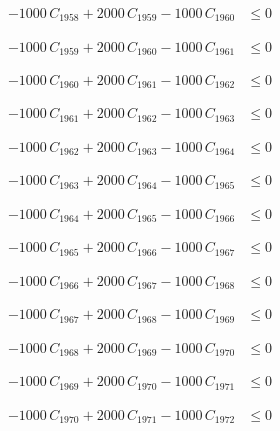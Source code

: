 \documentclass[a4paper,11pt]{article}
\begin{document}
\begin{align}
-1000\,C_{1958} + 2000\,C_{1959} - 1000\,C_{1960} &\leq 0 \nonumber
\end{align}

\begin{align}
-1000\,C_{1959} + 2000\,C_{1960} - 1000\,C_{1961} &\leq 0 \nonumber
\end{align}

\begin{align}
-1000\,C_{1960} + 2000\,C_{1961} - 1000\,C_{1962} &\leq 0 \nonumber
\end{align}

\begin{align}
-1000\,C_{1961} + 2000\,C_{1962} - 1000\,C_{1963} &\leq 0 \nonumber
\end{align}

\begin{align}
-1000\,C_{1962} + 2000\,C_{1963} - 1000\,C_{1964} &\leq 0 \nonumber
\end{align}

\begin{align}
-1000\,C_{1963} + 2000\,C_{1964} - 1000\,C_{1965} &\leq 0 \nonumber
\end{align}

\begin{align}
-1000\,C_{1964} + 2000\,C_{1965} - 1000\,C_{1966} &\leq 0 \nonumber
\end{align}

\begin{align}
-1000\,C_{1965} + 2000\,C_{1966} - 1000\,C_{1967} &\leq 0 \nonumber
\end{align}

\begin{align}
-1000\,C_{1966} + 2000\,C_{1967} - 1000\,C_{1968} &\leq 0 \nonumber
\end{align}

\begin{align}
-1000\,C_{1967} + 2000\,C_{1968} - 1000\,C_{1969} &\leq 0 \nonumber
\end{align}

\begin{align}
-1000\,C_{1968} + 2000\,C_{1969} - 1000\,C_{1970} &\leq 0 \nonumber
\end{align}

\begin{align}
-1000\,C_{1969} + 2000\,C_{1970} - 1000\,C_{1971} &\leq 0 \nonumber
\end{align}

\begin{align}
-1000\,C_{1970} + 2000\,C_{1971} - 1000\,C_{1972} &\leq 0 \nonumber
\end{align}
\end{document}
